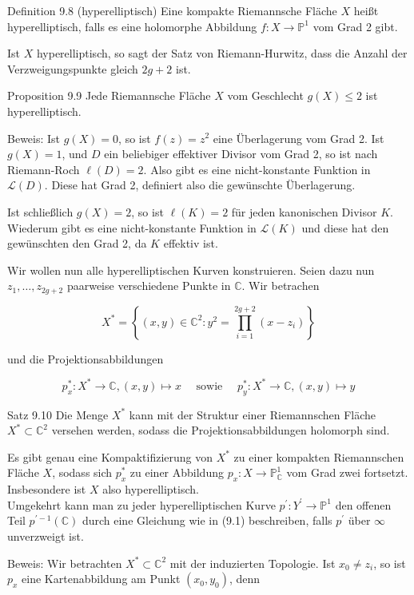 \documentclass[10pt, letterpaper]{article}
\begin{document}
Definition 9.8 (hyperelliptisch) Eine kompakte Riemannsche Fläche $X$ heißt hyperelliptisch, falls es eine holomorphe Abbildung $f: X \longrightarrow \mathbb{P}^{1}$ vom Grad 2 gibt.

Ist $X$ hyperelliptisch, so sagt der Satz von Riemann-Hurwitz, dass die Anzahl der Verzweigungspunkte gleich $2 g+2$ ist.

Proposition 9.9 Jede Riemannsche Fläche $X$ vom Geschlecht $g(X) \leqslant 2$ ist hyperelliptisch.

Beweis: Ist $g(X)=0$, so ist $f(z)=z^{2}$ eine Überlagerung vom Grad 2. Ist $g(X)=1$, und $D$ ein beliebiger effektiver Divisor vom Grad 2, so ist nach Riemann-Roch $\ell(D)=2$. Also gibt es eine nicht-konstante Funktion in $\mathcal{L}(D)$. Diese hat Grad 2, definiert also die gewünschte Überlagerung.

Ist schließlich $g(X)=2$, so ist $\ell(K)=2$ für jeden kanonischen Divisor $K$. Wiederum gibt es eine nicht-konstante Funktion in $\mathcal{L}(K)$ und diese hat den gewünschten den Grad 2, da $K$ effektiv ist.

Wir wollen nun alle hyperelliptischen Kurven konstruieren. Seien dazu nun $z_{1}, \ldots, z_{2 g+2}$ paarweise verschiedene Punkte in $\mathbb{C}$. Wir betrachen

$$
X^{*}=\left\{(x, y) \in \mathbb{C}^{2}: y^{2}=\prod_{i=1}^{2 g+2}\left(x-z_{i}\right)\right\}
$$

und die Projektionsabbildungen

$$
p_{x}^{*}: X^{*} \rightarrow \mathbb{C},(x, y) \mapsto x \quad \text { sowie } \quad p_{y}^{*}: X^{*} \rightarrow \mathbb{C},(x, y) \mapsto y
$$

Satz 9.10 Die Menge $X^{*}$ kann mit der Struktur einer Riemannschen Fläche $X^{*} \subset \mathbb{C}^{2}$ versehen werden, sodass die Projektionsabbildungen holomorph sind.

Es gibt genau eine Kompaktifizierung von $X^{*}$ zu einer kompakten Riemannschen Fläche $X$, sodass sich $p_{x}^{*}$ zu einer Abbildung $p_{x}: X \longrightarrow \mathbb{P}_{\mathbb{C}}^{1}$ vom Grad zwei fortsetzt. Insbesondere ist $X$ also hyperelliptisch.\\
Umgekehrt kann man zu jeder hyperelliptischen Kurve $p^{\prime}: Y^{\prime} \longrightarrow \mathbb{P}^{1}$ den offenen Teil $p^{\prime-1}(\mathbb{C})$ durch eine Gleichung wie in (9.1) beschreiben, falls $p^{\prime}$ über $\infty$ unverzweigt ist.

Beweis: Wir betrachten $X^{*} \subset \mathbb{C}^{2}$ mit der induzierten Topologie. Ist $x_{0} \neq z_{i}$, so ist $p_{x}$ eine Kartenabbildung am Punkt $\left(x_{0}, y_{0}\right)$, denn
\end{document}
